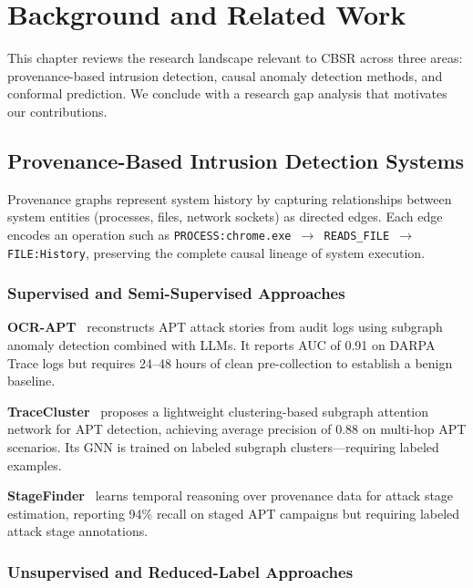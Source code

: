 \chapter{Background and Related Work}
\label{ch:literature}

This chapter reviews the research landscape relevant to CBSR across three areas: provenance-based
intrusion detection, causal anomaly detection methods, and conformal prediction. We conclude with
a research gap analysis that motivates our contributions.

\section{Provenance-Based Intrusion Detection Systems}

Provenance graphs represent system history by capturing relationships between system entities
(processes, files, network sockets) as directed edges. Each edge encodes an operation such as
\texttt{PROCESS:chrome.exe $\to$ READS\_FILE $\to$ FILE:History}, preserving the complete causal
lineage of system execution.

\subsection{Supervised and Semi-Supervised Approaches}

\textbf{OCR-APT}~\cite{ocrapt2025} reconstructs APT attack stories from audit logs using subgraph
anomaly detection combined with LLMs. It reports AUC of 0.91 on DARPA Trace logs but requires
24--48 hours of clean pre-collection to establish a benign baseline.

\textbf{TraceCluster}~\cite{tracecluster2026} proposes a lightweight clustering-based subgraph
attention network for APT detection, achieving average precision of 0.88 on multi-hop APT
scenarios. Its GNN is trained on labeled subgraph clusters---requiring labeled examples.

\textbf{StageFinder}~\cite{stagefinder2026} learns temporal reasoning over provenance data for
attack stage estimation, reporting 94\% recall on staged APT campaigns but requiring labeled
attack stage annotations.

\subsection{Unsupervised and Reduced-Label Approaches}

